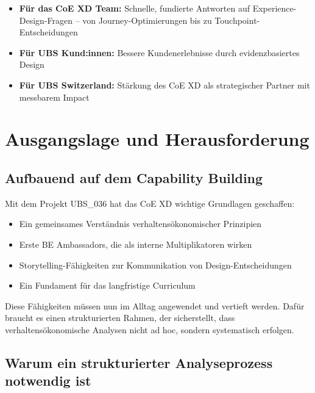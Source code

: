 \documentclass[11pt,a4paper]{article}
\begin{document}
\begin{itemize}
    \item \textbf{Für das CoE XD Team:} Schnelle, fundierte Antworten auf Experience-Design-Fragen -- von Journey-Optimierungen bis zu Touchpoint-Entscheidungen
    \item \textbf{Für UBS Kund:innen:} Bessere Kundenerlebnisse durch evidenzbasiertes Design
    \item \textbf{Für UBS Switzerland:} Stärkung des CoE XD als strategischer Partner mit messbarem Impact
\end{itemize}

\newpage
\section{Ausgangslage und Herausforderung}

\subsection{Aufbauend auf dem Capability Building}

Mit dem Projekt UBS\_036 hat das CoE XD wichtige Grundlagen geschaffen:

\begin{itemize}
    \item Ein gemeinsames Verständnis verhaltensökonomischer Prinzipien
    \item Erste BE Ambassadors, die als interne Multiplikatoren wirken
    \item Storytelling-Fähigkeiten zur Kommunikation von Design-Entscheidungen
    \item Ein Fundament für das langfristige Curriculum
\end{itemize}

\begin{fainfobox}
Diese Fähigkeiten müssen nun im Alltag angewendet und vertieft werden. Dafür braucht es einen strukturierten Rahmen, der sicherstellt, dass verhaltensökonomische Analysen nicht ad hoc, sondern systematisch erfolgen.
\end{fainfobox}

\subsection{Warum ein strukturierter Analyseprozess notwendig ist}
\end{document}
